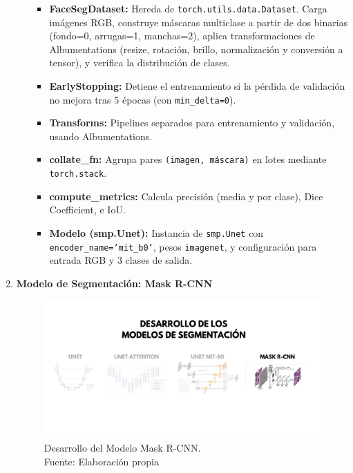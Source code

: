 \begin{enumerate}
\begin{itemize}
  
  \begin{itemize}
    \item \textbf{FaceSegDataset:} Hereda de \texttt{torch.utils.data.Dataset}. Carga imágenes RGB, construye máscaras multiclase a partir de dos binarias (fondo=0, arrugas=1, manchas=2), aplica transformaciones de Albumentations (resize, rotación, brillo, normalización y conversión a tensor), y verifica la distribución de clases.
    \item \textbf{EarlyStopping:} Detiene el entrenamiento si la pérdida de validación no mejora tras 5 épocas (con \texttt{min\_delta=0}).
    \item \textbf{Transforms:} Pipelines separados para entrenamiento y validación, usando Albumentations.
    \item \textbf{collate\_fn:} Agrupa pares \texttt{(imagen, máscara)} en lotes mediante \texttt{torch.stack}.
    \item \textbf{compute\_metrics:} Calcula precisión (media y por clase), Dice Coefficient, e IoU.
    \item \textbf{Modelo (smp.Unet):} Instancia de \texttt{smp.Unet} con \texttt{encoder\_name='mit\_b0'}, pesos \texttt{imagenet}, y configuración para entrada RGB y 3 clases de salida.
\end{itemize}

  \end{itemize}

  \newpage
  \item \textbf{Modelo de Segmentación: Mask R-CNN}
  \begin{figure}[H]
	\begin{center}
		\includegraphics[width=1\textwidth]{4/figures/desmask.png}
		\caption[Desarrollo del Modelo Mask R-CNN]{Desarrollo del Modelo Mask R-CNN.\\
		Fuente: Elaboración propia}
		\label{4:figdesmask}
	\end{center}
\end{figure}
  \begin{itemize}


\end{itemize}
\end{enumerate}
